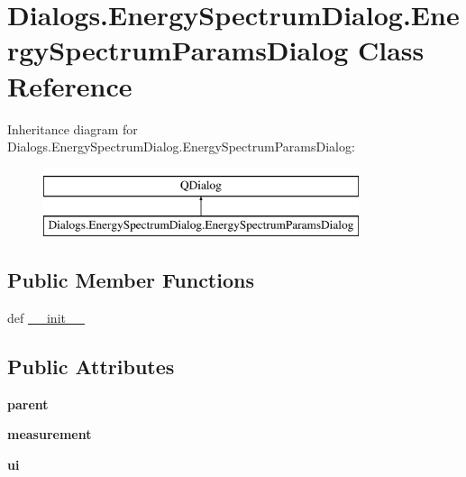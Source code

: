 \hypertarget{classDialogs_1_1EnergySpectrumDialog_1_1EnergySpectrumParamsDialog}{\section{Dialogs.\-Energy\-Spectrum\-Dialog.\-Energy\-Spectrum\-Params\-Dialog Class Reference}
\label{classDialogs_1_1EnergySpectrumDialog_1_1EnergySpectrumParamsDialog}
}
Inheritance diagram for Dialogs.\-Energy\-Spectrum\-Dialog.\-Energy\-Spectrum\-Params\-Dialog\-:\begin{figure}[H]
\begin{center}
\leavevmode
\includegraphics[height=2.000000cm]{classDialogs_1_1EnergySpectrumDialog_1_1EnergySpectrumParamsDialog}
\end{center}
\end{figure}
\subsection*{Public Member Functions}
\begin{DoxyCompactItemize}
\item 
def \hyperlink{classDialogs_1_1EnergySpectrumDialog_1_1EnergySpectrumParamsDialog_aef116ee9f9a1142443dfb8ef6623ddb1}{\-\_\-\-\_\-init\-\_\-\-\_\-}
\end{DoxyCompactItemize}
\subsection*{Public Attributes}
\begin{DoxyCompactItemize}
\item 
\hypertarget{classDialogs_1_1EnergySpectrumDialog_1_1EnergySpectrumParamsDialog_acc5342bc7256c7959dd329d1a85ab50a}{{\bfseries parent}}\label{classDialogs_1_1EnergySpectrumDialog_1_1EnergySpectrumParamsDialog_acc5342bc7256c7959dd329d1a85ab50a}

\item 
\hypertarget{classDialogs_1_1EnergySpectrumDialog_1_1EnergySpectrumParamsDialog_ae2440de847cb63aa6088b266c874f738}{{\bfseries measurement}}\label{classDialogs_1_1EnergySpectrumDialog_1_1EnergySpectrumParamsDialog_ae2440de847cb63aa6088b266c874f738}

\item 
\hypertarget{classDialogs_1_1EnergySpectrumDialog_1_1EnergySpectrumParamsDialog_af74d8d3535de50415f392f68338126f7}{{\bfseries ui}}\label{classDialogs_1_1EnergySpectrumDialog_1_1EnergySpectrumParamsDialog_af74d8d3535de50415f392f68338126f7}

\end{DoxyCompactItemize}
